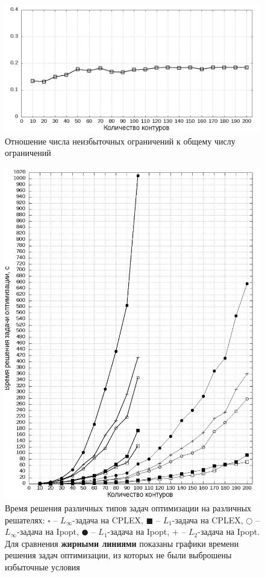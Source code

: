 \documentclass[a4paper, 10pt]{article}
\theoremstyle{definition}
\theoremstyle{plain}
\theoremstyle{plain}
\begin{document}
\begin{figure}[hh]
 \includegraphics[width=\textwidth]{images/Reduced-constraints-ratio-graph.jpeg}
 \caption{Отношение числа неизбыточных ограничений к общему числу ограничений}
 \label{Reduced-constraints-ratio-graph}
\end{figure}

\begin{figure}[p]
 \includegraphics[width=\textwidth]{images/Problem-solution-time-graphs.jpeg}
 \captionsetup{singlelinecheck=off}
 \caption{Время решения различных типов задач оптимизации на различных
 решателях:
 $\square$ -- $L_{\infty}$-задача на CPLEX,
 $\blacksquare$ -- $L_{1}$-задача на CPLEX,
 $\Circle$ -- $L_{\infty}$-задача на Ipopt,
 $\CIRCLE$ -- $L_{1}$-задача на Ipopt,
 $+$ -- $L_{2}$-задача на Ipopt. Для сравнения \textbf{жирными линиями} показаны
 графики времени решения задач оптимизации, из которых не были выброшены
 избыточные условия}
 \label{Problem-solution-time-graphs}
\end{figure}
\end{document}
